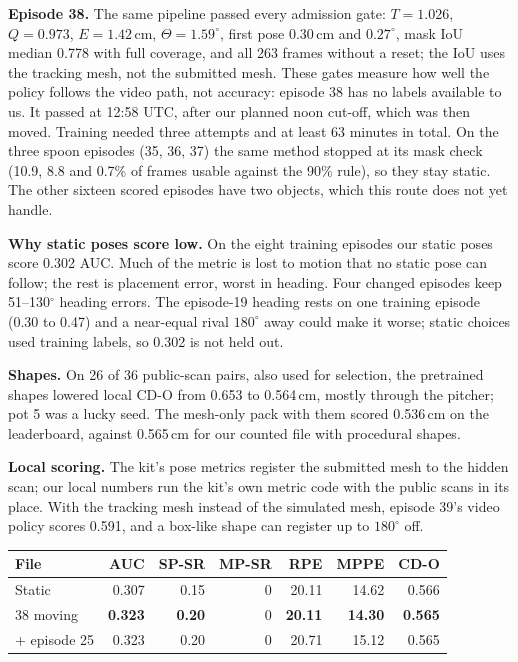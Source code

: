 \documentclass[10pt, logo, copyright, anonymous]{nvidiaextabstract}
\begin{document}
\textbf{Episode 38.} The same pipeline passed every admission gate:
$T=1.026$, $Q=0.973$, $E=1.42$\,cm, $\Theta=1.59^\circ$, first pose
0.30\,cm and $0.27^\circ$, mask IoU median 0.778 with full coverage, and all
263 frames without a reset; the IoU uses the tracking mesh, not the
submitted mesh. These gates measure how well the policy follows the video
path, not accuracy: episode 38 has no labels available to us. It passed at
12:58 UTC, after our planned noon cut-off, which was then moved.
Training needed three attempts and at least 63 minutes in total. On the
three spoon episodes (35, 36, 37) the same method stopped at its mask check
(10.9, 8.8 and 0.7\% of frames usable against the 90\% rule), so they stay
static. The other sixteen scored episodes have two objects, which this
route does not yet handle.

\textbf{Why static poses score low.} On the eight training episodes our
static poses score 0.302 AUC. Much of the metric is lost to motion that no
static pose can follow; the rest is placement error, worst in heading.
Four changed episodes keep 51--130$^\circ$ heading errors. The episode-19
heading rests on one training episode (0.30 to 0.47) and a near-equal rival
$180^\circ$ away could make it worse; static choices used training labels,
so 0.302 is not held out.

\textbf{Shapes.} On 26 of 36 public-scan pairs, also used for selection,
the pretrained shapes lowered local CD-O from 0.653 to 0.564\,cm, mostly
through the pitcher; pot 5 was a lucky seed. The mesh-only
pack with them scored 0.536\,cm on the leaderboard, against 0.565\,cm for
our counted file with procedural shapes.

\textbf{Local scoring.} The kit's pose metrics register the submitted mesh
to the hidden scan; our local numbers run the kit's own metric code with the
public scans in its place. With the tracking mesh instead of the simulated
mesh, episode 39's video policy scores 0.591, and a box-like shape can
register up to $180^\circ$ off.

\noindent\begin{minipage}{\columnwidth}
\centering\footnotesize
\setlength{\tabcolsep}{1.6pt}
\begin{tabular}{lrrrrrr}
\toprule
File & AUC & SP-SR & MP-SR & RPE & MPPE & CD-O \\
\midrule
Static & 0.307 & 0.15 & 0 & 20.11 & 14.62 & 0.566 \\
38 moving & \textbf{0.323} & \textbf{0.20} & 0 & \textbf{20.11} & \textbf{14.30} & \textbf{0.565} \\
+ episode 25 & 0.323 & 0.20 & 0 & 20.71 & 15.12 & 0.565 \\
\bottomrule
\end{tabular}
\end{minipage}\par
\end{document}
